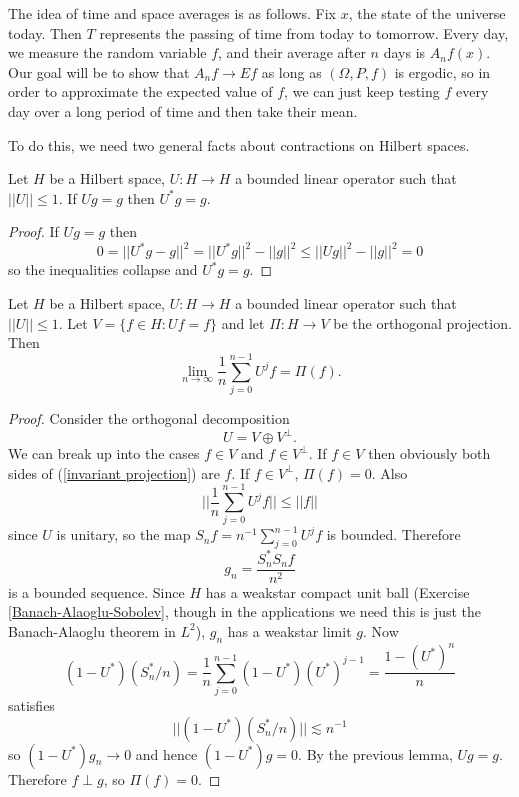 The idea of time and space averages is as follows. Fix $x$, the state of the universe today. Then $T$ represents the passing of time from today to tomorrow.
Every day, we measure the random variable $f$, and their average after $n$ days is $A_nf(x)$.
Our goal will be to show that $A_nf \to Ef$ as long as $(\Omega, P, f)$ is ergodic, so in order to approximate the expected value of $f$, we can just keep testing $f$ every day over a long period of time and then take their mean.

To do this, we need two general facts about contractions on Hilbert spaces.
\begin{lemma}
Let $H$ be a Hilbert space, $U: H \to H$ a bounded linear operator such that $||U|| \leq 1$.
If $Ug = g$ then $U^*g = g$.
\end{lemma}
\begin{proof}
If $Ug = g$ then
\[0 = ||U^*g - g||^2 = ||U^*g||^2 - ||g||^2 \leq ||Ug||^2 - ||g||^2 = 0\]
so the inequalities collapse and $U^*g = g$.
\end{proof}

\begin{lemma}
Let $H$ be a Hilbert space, $U: H \to H$ a bounded linear operator such that $||U|| \leq 1$.
Let $V = \{f \in H: Uf = f\}$ and let $\Pi: H \to V$ be the orthogonal projection. Then
\begin{equation}
\label{invariant projection}
\lim_{n \to \infty} \frac{1}{n} \sum_{j=0}^{n-1} U^jf = \Pi(f).
\end{equation}
\end{lemma}
\begin{proof}
Consider the orthogonal decomposition
\[U = V \oplus V^\perp.\]
We can break up into the cases $f \in V$ and $f \in V^\perp$.
If $f \in V$ then obviously both sides of (\ref{invariant projection}) are $f$.
If $f \in V^\perp$, $\Pi(f) = 0$.
Also
\[||\frac{1}{n} \sum_{j=0}^{n-1} U^jf|| \leq ||f||\]
since $U$ is unitary, so the map $S_nf = n^{-1} \sum_{j=0}^{n-1} U^jf$ is bounded.
Therefore
\[g_n = \frac{S_n^*S_nf}{n^2}\]
is a bounded sequence. Since $H$ has a weakstar compact unit ball (Exercise \ref{Banach-Alaoglu-Sobolev}, though in the applications we need this is just the Banach-Alaoglu theorem in $L^2$), $g_n$ has a weakstar limit $g$.
Now
\[(1 - U^*)(S_n^*/n) = \frac{1}{n} \sum_{j=0}^{n-1} (1 - U^*)(U^*)^{j-1} = \frac{1 - (U^*)^n}{n}\]
satisfies
\[||(1 - U^*)(S_n^*/n)|| \lesssim n^{-1}\]
so $(1 - U^*)g_n \to 0$ and hence $(1 - U^*)g = 0$.
By the previous lemma, $Ug = g$. Therefore $f \perp g$, so $\Pi(f) = 0$.
\end{proof}

